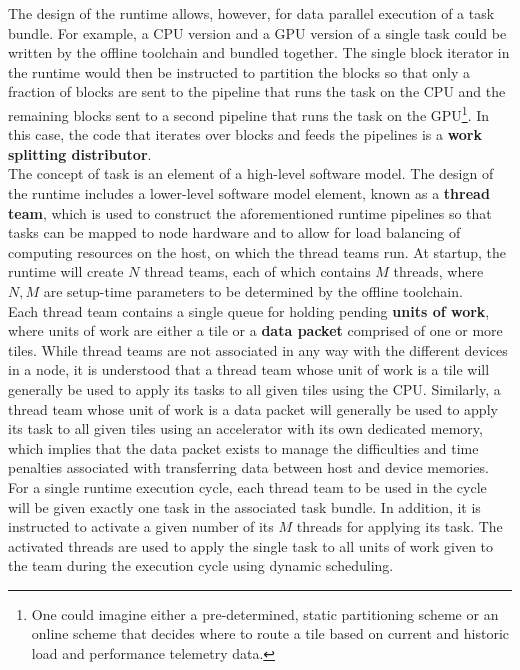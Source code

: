 \documentclass{article}
\begin{document}
The design of the runtime allows, however, for data parallel execution of a task
bundle.  For example, a CPU version and a GPU version of a single task could be
written by the offline toolchain and bundled together.  The single block
iterator in the runtime would then be instructed to partition the blocks so that
only a fraction of blocks are sent to the pipeline that runs the task on the CPU
and the remaining blocks sent to a second pipeline that runs the task on the
GPU\footnote{One could imagine either a pre-determined, static partitioning
scheme or an online scheme that decides where to route a tile based on current
and historic load and performance telemetry data.}.  In this case, the code that
iterates over blocks and feeds the pipelines is a \textbf{work splitting
distributor}.\\

The concept of task is an element of a high-level software model.  The design of
the runtime includes a lower-level software model element, known as a
\textbf{thread team}, which is used to construct the aforementioned runtime
pipelines so that tasks can be mapped to node hardware and to allow for load
balancing of computing resources on the host, on which the thread teams run.
At startup, the runtime will create $N$ thread teams, each of which contains $M$
threads, where $N, M$ are setup-time parameters to be determined by the offline
toolchain.\\

Each thread team contains a single queue for holding pending \textbf{units of
work}, where units of work are either a tile or a \textbf{data packet} comprised
of one or more tiles.  While thread teams are not associated in any way with the
different devices in a node, it is understood that a thread team whose unit of
work is a tile will generally be used to apply its tasks to all given tiles
using the CPU.  Similarly, a thread team whose unit of work is a data packet
will generally be used to apply its task to all given tiles using an
accelerator with its own dedicated memory, which implies that the data packet
exists to manage the difficulties and time penalties associated with
transferring data between host and device memories.\\

For a single runtime execution cycle, each thread team to be used in the cycle
will be given exactly one task in the associated task bundle.  In addition, it
is instructed to activate a given number of its $M$ threads for applying its
task.  The activated threads are used to apply the single task to all units of
work given to the team during the execution cycle using dynamic scheduling.\\
\end{document}
